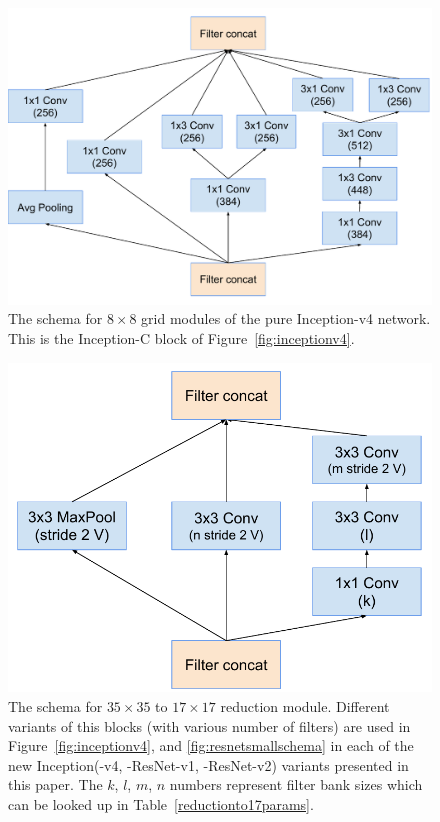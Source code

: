 \begin{figure}
\centering
\includegraphics[width=\linewidth]{wide8x8module}
\caption{The schema for $8\times 8$ grid modules of the pure Inception-v4
 network. This is the Inception-C block of Figure~\ref{fig:inceptionv4}.}
\label{fig:wide8x8module}
\end{figure}
\begin{figure}
\centering
\includegraphics[width=\linewidth]{reductionto17}
\caption{The schema for $35\times 35$ to $17\times 17$ reduction module.
  Different variants of this blocks (with various number of filters) are
  used in Figure~\ref{fig:inceptionv4}, and \ref{fig:resnetsmallschema}
  in each of the new Inception(-v4, -ResNet-v1, -ResNet-v2) variants
  presented in this paper. The $k$, $l$, $m$, $n$ numbers represent
  filter bank sizes which can be looked up in Table~\ref{reductionto17params}.
}
\label{fig:reductionto17}
\end{figure}
